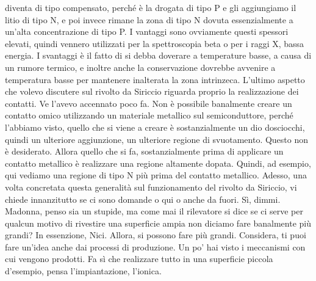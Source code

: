diventa di tipo compensato, perché è la drogata di tipo P e gli aggiungiamo il litio di tipo N, e poi invece rimane la zona di tipo N dovuta essenzialmente a un'alta concentrazione di tipo P. I vantaggi sono ovviamente questi spessori elevati, quindi vennero utilizzati per la spettroscopia beta o per i raggi X, bassa energia. I svantaggi è il fatto di si debba doverare a temperature basse, a causa di un rumore termico, e inoltre anche la conservazione dovrebbe avvenire a temperatura basse per mantenere inalterata la zona intrinzeca. L'ultimo aspetto che volevo discutere sul rivolto da Siriccio riguarda proprio la realizzazione dei contatti. Ve l'avevo accennato poco fa. Non è possibile banalmente creare un contatto omico utilizzando un materiale metallico sul semiconduttore, perché l'abbiamo visto, quello che si viene a creare è sostanzialmente un dio dosciocchi, quindi un ulteriore aggiunzione, un ulteriore regione di svuotamento. Questo non è desiderato. Allora quello che si fa, sostanzialmente prima di applicare un contatto metallico è realizzare una regione altamente dopata. Quindi, ad esempio, qui vediamo una regione di tipo N più prima del contatto metallico. Adesso, una volta concretata questa generalità sul funzionamento del rivolto da Siriccio, vi chiede innanzitutto se ci sono domande o qui o anche da fuori. Sì, dimmi. Madonna, penso sia un stupide, ma come mai il rilevatore si dice se ci serve per qualcun motivo di rivestire una superficie ampia non diciamo fare banalmente più grandi? In essenzione, Nici. Allora, si possono fare più grandi. Considera, ti puoi fare un'idea anche dai processi di produzione. Un po' hai visto i meccanismi con cui vengono prodotti. Fa sì che realizzare tutto in una superficie piccola d'esempio, pensa l'impiantazione, l'ionica.


